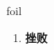 
\begin{frame}
{\huge foil}
\begin{center}
\begin{enumerate}\Large
  \item \textbf{挫败}
\end{enumerate}
\end{center}
\end{frame}
